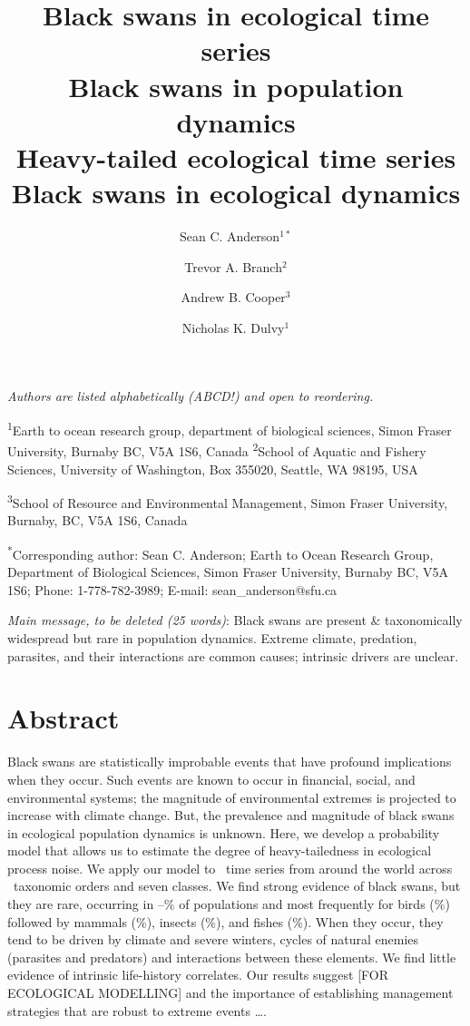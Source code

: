 \documentclass[12pt]{article}
\title{Black swans in ecological time series\\Black swans in population dynamics\\Heavy-tailed ecological time series\\Black swans in ecological dynamics}
\author{
Sean C. Anderson$^{1\ast}$ \and
Trevor A. Branch$^2$ \and
Andrew B. Cooper$^3$ \and
Nicholas K. Dulvy$^1$
}
\date{}
\begin{document}

\onehalfspacing

\maketitle
\thispagestyle{empty}

\noindent
\textit{Authors are listed alphabetically (ABCD!) and open to reordering.}

\noindent
\textsuperscript{1}Earth to ocean research group, department of biological sciences, Simon Fraser University, Burnaby BC, V5A 1S6, Canada
\noindent
\textsuperscript{2}School of Aquatic and Fishery Sciences, University of Washington, Box 355020, Seattle, WA 98195, USA

\noindent
\textsuperscript{3}School of Resource and Environmental Management, Simon Fraser University, Burnaby, BC, V5A 1S6, Canada

\noindent
\textsuperscript{*}Corresponding author: Sean C. Anderson; Earth to Ocean Research Group, Department of Biological Sciences, Simon Fraser University, Burnaby BC, V5A 1S6; Phone: 1-778-782-3989; E-mail: sean\_anderson@sfu.ca

\clearpage

\setcounter{page}{1}

\noindent
\textit{Main message, to be deleted (25 words)}: Black swans are present \& taxonomically widespread but rare in population dynamics.
Extreme climate, predation, parasites, and their interactions are common causes; intrinsic drivers are unclear.


\section{Abstract}

Black swans are statistically improbable events that have profound implications when they occur. Such events are known to occur in financial, social, and environmental systems; the magnitude of environmental extremes is projected to increase with climate change. But, the prevalence and magnitude of black swans in ecological population dynamics is unknown. Here, we develop a probability model that allows us to estimate the degree of heavy-tailedness in ecological process noise. We apply our model to \NPops\ time series from around the world across \NOrders\ taxonomic orders and seven classes. We find strong evidence of black swans, but they are rare, occurring in \overallMinPerc--\overallMaxPerc\% of populations and most frequently for birds (\AvesRangePerc\%) followed by mammals (\MammaliaRangePerc\%), insects (\InsectaRangePerc\%), and fishes (\OsteichthyesRangePerc\%). When they occur, they tend to be driven by climate and severe winters, cycles of natural enemies (parasites and predators) and interactions between these elements. We find little evidence of intrinsic life-history correlates.
Our results suggest [FOR ECOLOGICAL MODELLING]
and the importance of establishing management strategies that are robust to extreme events \ldots.
\end{document}
